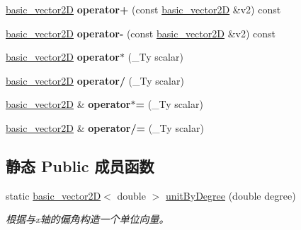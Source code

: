 \begin{DoxyCompactItemize}
\mbox{\label{structbasic__vector2_d_a0d01680904379f6984ee35cbe0ba3cf2}} 
\hyperlink{structbasic__vector2_d}{basic\+\_\+vector2D} {\bfseries operator+} (const \hyperlink{structbasic__vector2_d}{basic\+\_\+vector2D} \&v2) const
\item 
\mbox{\label{structbasic__vector2_d_a7d335c93ec37013c5d4804bd721a04ac}} 
\hyperlink{structbasic__vector2_d}{basic\+\_\+vector2D} {\bfseries operator-\/} (const \hyperlink{structbasic__vector2_d}{basic\+\_\+vector2D} \&v2) const
\item 
\mbox{\label{structbasic__vector2_d_a749249ddf6d61699428d2dee790dfd9a}} 
\hyperlink{structbasic__vector2_d}{basic\+\_\+vector2D} {\bfseries operator$\ast$} (\+\_\+\+Ty scalar)
\item 
\mbox{\label{structbasic__vector2_d_a13a6172f8b5e7308964a372ed57a794b}} 
\hyperlink{structbasic__vector2_d}{basic\+\_\+vector2D} {\bfseries operator/} (\+\_\+\+Ty scalar)
\item 
\mbox{\label{structbasic__vector2_d_aab570d392ff446a6e16f6ca648ee65c6}} 
\hyperlink{structbasic__vector2_d}{basic\+\_\+vector2D} \& {\bfseries operator$\ast$=} (\+\_\+\+Ty scalar)
\item 
\mbox{\label{structbasic__vector2_d_ac608e28b6dc06bfeb28236e44bf850d0}} 
\hyperlink{structbasic__vector2_d}{basic\+\_\+vector2D} \& {\bfseries operator/=} (\+\_\+\+Ty scalar)
\end{DoxyCompactItemize}
\subsection*{静态 Public 成员函数}
\begin{DoxyCompactItemize}
\item 
static \hyperlink{structbasic__vector2_d}{basic\+\_\+vector2D}$<$ double $>$ \hyperlink{structbasic__vector2_d_aa31b5b9b9261d28ecd2626ba38b61278}{unit\+By\+Degree} (double degree)
\begin{DoxyCompactList}\small\item\em 根据与x轴的偏角构造一个单位向量。 \end{DoxyCompactList}\end{DoxyCompactItemize}
